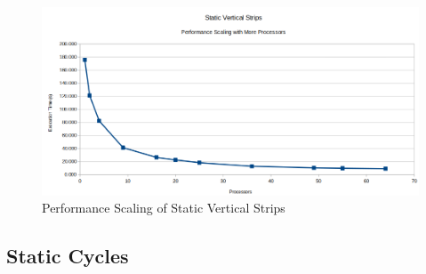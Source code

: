 \documentclass[11pt]{article}
\begin{document}
		
		\begin{figure}[H]
			\centering
			\includegraphics[width=0.7\linewidth]{"Pictures/Static Strips"}
			\caption{Performance Scaling of Static Vertical Strips}
			\label{fig:static-strips}
		\end{figure}
	
	\subsection{Static Cycles}
\end{document}
